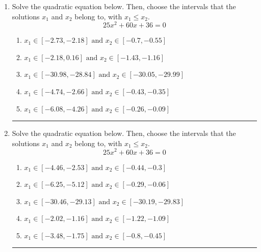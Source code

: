 \documentclass[14pt]{extbook}
\newcommand{\litem}[1]{\item#1\hspace*{-1cm}\rule{\textwidth}{0.4pt}}
\begin{document}
\begin{enumerate}
\litem{
Solve the quadratic equation below. Then, choose the intervals that the solutions $x_1$ and $x_2$ belong to, with $x_1 \leq x_2$.\[ 25x^{2} +60 x + 36 = 0 \]\begin{enumerate}[label=\Alph*.]
\item \( x_1 \in [-2.73, -2.18] \text{ and } x_2 \in [-0.7, -0.55] \)
\item \( x_1 \in [-2.18, 0.16] \text{ and } x_2 \in [-1.43, -1.16] \)
\item \( x_1 \in [-30.98, -28.84] \text{ and } x_2 \in [-30.05, -29.99] \)
\item \( x_1 \in [-4.74, -2.66] \text{ and } x_2 \in [-0.43, -0.35] \)
\item \( x_1 \in [-6.08, -4.26] \text{ and } x_2 \in [-0.26, -0.09] \)

\end{enumerate} }
\litem{
Solve the quadratic equation below. Then, choose the intervals that the solutions $x_1$ and $x_2$ belong to, with $x_1 \leq x_2$.\[ 25x^{2} +60 x + 36 = 0 \]\begin{enumerate}[label=\Alph*.]
\item \( x_1 \in [-4.46, -2.53] \text{ and } x_2 \in [-0.44, -0.3] \)
\item \( x_1 \in [-6.25, -5.12] \text{ and } x_2 \in [-0.29, -0.06] \)
\item \( x_1 \in [-30.46, -29.13] \text{ and } x_2 \in [-30.19, -29.83] \)
\item \( x_1 \in [-2.02, -1.16] \text{ and } x_2 \in [-1.22, -1.09] \)
\item \( x_1 \in [-3.48, -1.75] \text{ and } x_2 \in [-0.8, -0.45] \)


\end{enumerate}}
\end{enumerate}
\end{document}
